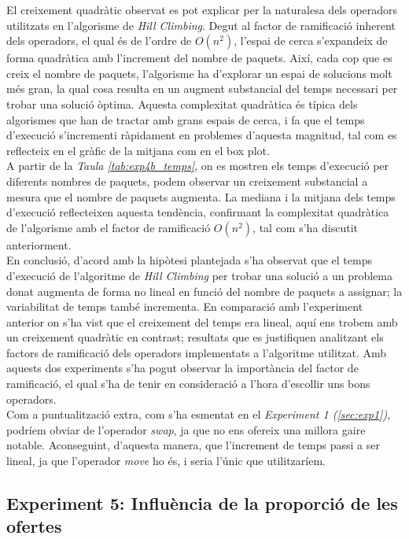 \documentclass[a4paper]{article}
\begin{document}
	El creixement quadràtic observat es pot explicar per la naturalesa dels operadors utilitzats en l'algorisme de \textit{Hill Climbing}. Degut al factor de ramificació inherent dels operadors, el qual és de l'ordre de $O(n^2)$, l'espai de cerca s'expandeix de forma quadràtica amb l'increment del nombre de paquets. Així, cada cop que es creix el nombre de paquets, l'algorisme ha d'explorar un espai de solucions molt més gran, la qual cosa resulta en un augment substancial del temps necessari per trobar una solució òptima. Aquesta complexitat quadràtica és típica dels algorismes que han de tractar amb grans espais de cerca, i fa que el temps d'execució s'incrementi ràpidament en problemes d'aquesta magnitud, tal com es reflecteix en el gràfic de la mitjana com en el box plot. \\
	
	A partir de la \textit{Taula \ref{tab:exp4b_temps}}, on es mostren els temps d'execució per diferents nombres de paquets, podem observar un creixement substancial a mesura que el nombre de paquets augmenta. La mediana i la mitjana dels temps d'execució reflecteixen aquesta tendència, confirmant la complexitat quadràtica de l'algorisme amb el factor de ramificació $O(n^2)$, tal com s'ha discutit anteriorment. \\
	
	En conclusió, d'acord amb la hipòtesi plantejada s'ha observat que el temps d'execució de l'algoritme de \textit{Hill Climbing} per trobar una solució a un problema donat augmenta de forma no lineal en funció del nombre de paquets a assignar; la variabilitat de temps també incrementa. En comparació amb l'experiment anterior on s'ha vist que el creixement del temps era lineal, aquí ens trobem amb un creixement quadràtic en contrast; resultats que es justifiquen analitzant els factors de ramificació dels operadors implementats a l'algoritme utilitzat. Amb aquests dos experiments s'ha pogut observar la importància del factor de ramificació, el qual s'ha de tenir en consideració a l'hora d'escollir uns bons operadors. \\
	
	Com a puntualització extra, com s'ha esmentat en el \textit{Experiment 1 (\ref{sec:exp1})}, podríem obviar de l'operador \textit{swap}, ja que no ens ofereix una millora gaire notable. Aconseguint, d'aquesta manera, que l'increment de temps passi a ser lineal, ja que l'operador \textit{move} ho és, i seria l'únic que utilitzaríem. \\


	\subsection{Experiment 5: Influència de la proporció de les ofertes}
	
\end{document}
